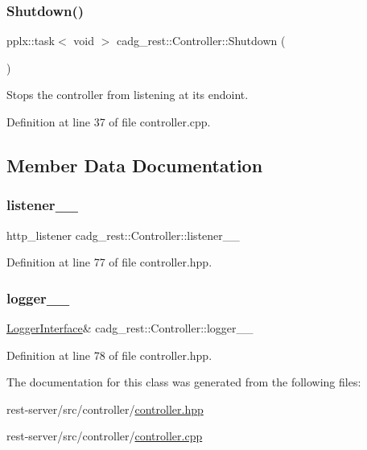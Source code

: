 \subsubsection{\texorpdfstring{Shutdown()}{Shutdown()}}
{\footnotesize\ttfamily pplx\+::task$<$ void $>$ cadg\+\_\+rest\+::\+Controller\+::\+Shutdown (\begin{DoxyParamCaption}{ }\end{DoxyParamCaption})}



Stops the controller from listening at it\textquotesingle{}s endoint. 



Definition at line 37 of file controller.\+cpp.



\subsection{Member Data Documentation}
\mbox{\label{classcadg__rest_1_1_controller_aaf8ae6c7bdea43d5530e81dd0e8afa44}} 
\subsubsection{\texorpdfstring{listener\_\_}{listener\_\_}}
{\footnotesize\ttfamily http\+\_\+listener cadg\+\_\+rest\+::\+Controller\+::listener\+\_\+\+\_\+\hspace{0.3cm}{\ttfamily [protected]}}



Definition at line 77 of file controller.\+hpp.

\mbox{\label{classcadg__rest_1_1_controller_a5eebad0222becb1157f8dd7b9e978c37}} 
\subsubsection{\texorpdfstring{logger\_\_}{logger\_\_}}
{\footnotesize\ttfamily \mbox{\hyperlink{classcadg__rest_1_1_logger_interface}{Logger\+Interface}}\& cadg\+\_\+rest\+::\+Controller\+::logger\+\_\+\+\_\+\hspace{0.3cm}{\ttfamily [protected]}}



Definition at line 78 of file controller.\+hpp.



The documentation for this class was generated from the following files\+:\begin{DoxyCompactItemize}
\item 
rest-\/server/src/controller/\mbox{\hyperlink{controller_8hpp}{controller.\+hpp}}\item 
rest-\/server/src/controller/\mbox{\hyperlink{controller_8cpp}{controller.\+cpp}}\end{DoxyCompactItemize}
